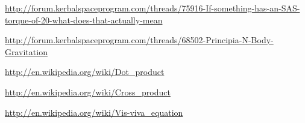 \documentclass[11pt]{report}
\begin{document}
\begin{thebibliography}{Kerbin}
  \url{http://forum.kerbalspaceprogram.com/threads/75916-If-something-has-an-SAS-torque-of-20-what-does-that-actually-mean}

  \url{http://forum.kerbalspaceprogram.com/threads/68502-Principia-N-Body-Gravitation}

  \url{http://en.wikipedia.org/wiki/Dot_product}

  \url{http://en.wikipedia.org/wiki/Cross_product}

  \url{http://en.wikipedia.org/wiki/Vis-viva_equation}

\end{thebibliography}
\end{document}
